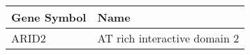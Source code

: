 \begin{tabular}{ll}
\toprule
Gene Symbol &                         Name \\
\midrule
      ARID2 & AT rich interactive domain 2 \\
\bottomrule
\end{tabular}
